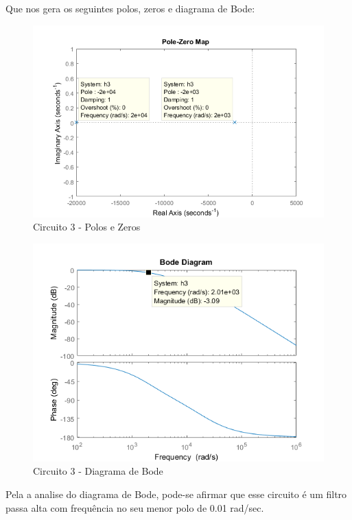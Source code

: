 \documentclass[a4paper, 12pt]{article}
\begin{document}
			Que nos gera os seguintes polos, zeros e diagrama de Bode:	
			\begin{figure}[!ht]
				\centering
				\includegraphics[scale=0.7]{img/1e_circ3.png}
				\caption{Circuito 3 - Polos e Zeros}	
			\end{figure}	
			\newpage
			\begin{figure}[!ht]
				\centering
				\includegraphics[scale=0.7]{img/1f_circ3.png}
				\caption{Circuito 3 - Diagrama de Bode}	
			\end{figure}			
			Pela a analise do diagrama de Bode, pode-se afirmar que esse circuito é um filtro passa alta com frequência no seu menor polo de 0.01 rad/sec.
\end{document}
